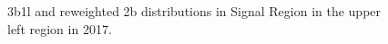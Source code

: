 \begin{figure}[ht]
 
 
    \caption{3b1l and reweighted 2b distributions in Signal Region in the upper left region in 2017.}
    \label{fig:upper-left-3b1l-SR-2017}
\end{figure}


